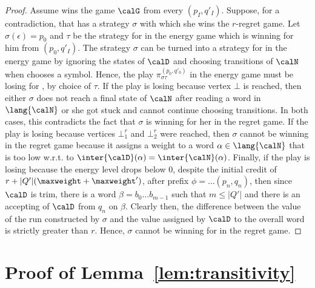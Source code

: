 \documentclass[a4paper]{article}
\begin{document}
\begin{proof}
	Assume \adam wins the game $\calG$ from every $(p_I,q'_I)$. Suppose, for
	a contradiction, that \eve has a strategy $\sigma$ with which she wins
	the $r$-regret game. Let $\sigma(\epsilon) = p_0$ and $\tau$ be the
	strategy for \adam in the energy game which is winning for him from
	$(p_0,q'_I)$. The strategy $\sigma$ can be turned into a strategy for
	\eve in the energy game by ignoring the states of $\calD$ and choosing
	transitions of $\calN$ when \adam chooses a symbol. Hence, the play
	$\pi^{(p_0,q'_0)}_{\sigma \tau}$ in the energy game must be losing for
	\eve, by choice of $\tau$. If the play is losing because vertex $\bot$
	is reached, then either $\sigma$ does not reach a final state of $\calN$
	after reading a word in $\lang{\calN}$ or she got stuck and cannot
	continue choosing transitions. In both cases, this contradicts the fact
	that $\sigma$ is winning for her in the regret game. If the play is
	losing because vertices $\bot^r_1$ and $\bot^r_2$ were reached, then
	$\sigma$ cannot be winning in the regret game because it assigns a
	weight to a word $\alpha \in \lang{\calN}$ that is too low w.r.t. to
	$\inter{\calD}(\alpha) = \inter{\calN}(\alpha)$. Finally, if the play is
	losing because the energy level drops below $0$, despite the initial
	credit of $r + |Q'|(\maxweight +
	\maxweight')$, after prefix $\phi = \dots (p_n,q_n)$, then since $\calD$
	is trim, there is a word $\beta = b_0 \dots b_{m-1}$ such that $m \le
	|Q'|$ and there is an accepting of $\calD$ from $q_n$ on $\beta$.
	Clearly then, the difference between the value of the run constructed
	by $\sigma$ and the value assigned by $\calD$ to the overall word is
	strictly greater than $r$. Hence, $\sigma$ cannot be winning for \eve
	in the regret game.
\end{proof}

\section{Proof of Lemma~\ref{lem:transitivity}}
\end{document}
